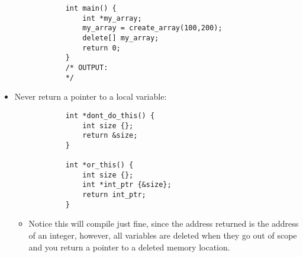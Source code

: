 \begin{itemize}
\begin{verbatim}
            int main() {
                int *my_array;
                my_array = create_array(100,200);
                delete[] my_array;
                return 0;
            }
            /* OUTPUT:
            */
        \end{verbatim}
    
    \item Never return a pointer to a local variable:
        \begin{verbatim}
            int *dont_do_this() {
                int size {};
                return &size;
            }

            int *or_this() {
                int size {};
                int *int_ptr {&size};
                return int_ptr;
            }
        \end{verbatim}
        \begin{itemize}
            \item Notice this will compile just fine, since the address returned is the address of an integer, however, all variables are deleted when they go out of scope and you return a pointer to a deleted memory location.
        \end{itemize}
\end{itemize}
